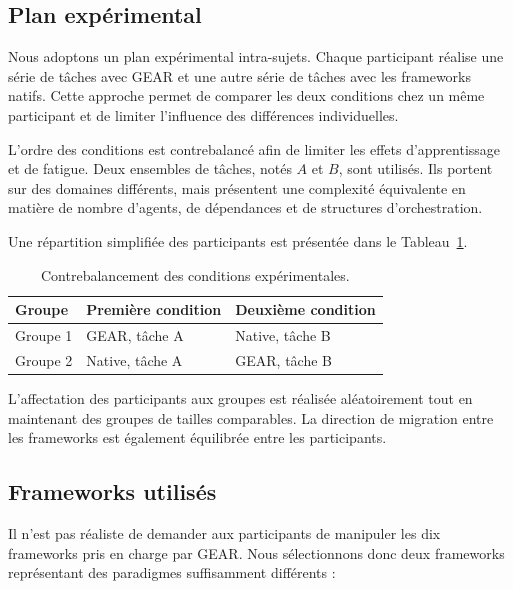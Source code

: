 \subsection{Plan expérimental}
\label{subsec:plan-experimental}

Nous adoptons un plan expérimental intra-sujets. Chaque participant
réalise une série de tâches avec GEAR et une autre série de tâches avec
les frameworks natifs. Cette approche permet de comparer les deux
conditions chez un même participant et de limiter l'influence des
différences individuelles.

L'ordre des conditions est contrebalancé afin de limiter les effets
d'apprentissage et de fatigue. Deux ensembles de tâches, notés $A$ et
$B$, sont utilisés. Ils portent sur des domaines différents, mais
présentent une complexité équivalente en matière de nombre d'agents,
de dépendances et de structures d'orchestration.

Une répartition simplifiée des participants est présentée dans le
Tableau~\ref{tab:contrebalancement}.

\begin{table}[t]
    \centering
    \caption{Contrebalancement des conditions expérimentales.}
    \label{tab:contrebalancement}
    \small
    \begin{tabularx}{\columnwidth}{@{}l>{\raggedright\arraybackslash}X>{\raggedright\arraybackslash}X@{}}
        \toprule
        \textbf{Groupe}
        & \textbf{Première condition}
        & \textbf{Deuxième condition} \\
        \midrule
        Groupe 1
            & GEAR, tâche A
            & Native, tâche B \\
        Groupe 2
            & Native, tâche A
            & GEAR, tâche B \\
        \bottomrule
    \end{tabularx}
\end{table}

L'affectation des participants aux groupes est réalisée aléatoirement
tout en maintenant des groupes de tailles comparables. La direction de
migration entre les frameworks est également équilibrée entre les
participants.


\subsection{Frameworks utilisés}
\label{subsec:frameworks-experience}

Il n'est pas réaliste de demander aux participants de manipuler les dix
frameworks pris en charge par GEAR. Nous sélectionnons donc deux
frameworks représentant des paradigmes suffisamment différents :

